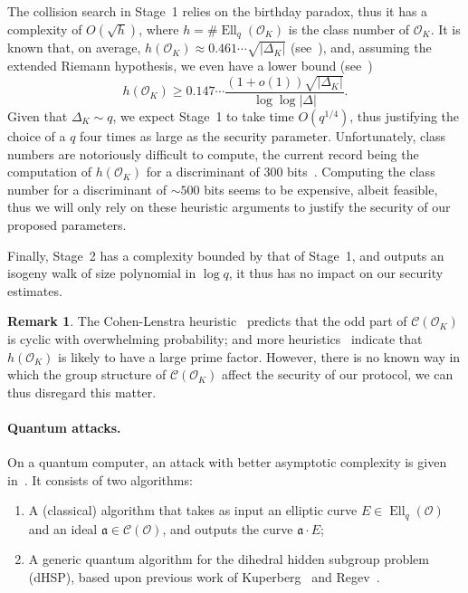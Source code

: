 \documentclass{article}
\newcommand{\Cl}{\mathcal{C}}
\renewcommand{\O}{\mathcal{O}}
\renewcommand{\frak}{\mathfrak}
\theoremstyle{definition}
\newtheorem{remark}[theorem]{Remark}
\DeclareMathOperator{\Ell}{Ell}
\begin{document}
The collision search in Stage~1 relies on the birthday paradox, thus
it has a complexity of $O(\sqrt{h})$, where $h=\#\Ell_q(\O_K)$ is the
class number of $\O_K$.  It is known that, on average,
$h(\O_K)≈0.461\cdots\sqrt{|Δ_K|}$ (see~\cite[5.10]{Cohen1993}), and,
assuming the extended Riemann hypothesis, we even have a lower bound
(see~\cite{littlewood1928class})
\[h(\O_K) ≥ 0.147\cdots\frac{(1+o(1))\sqrt{|Δ_K|}}{\log\log|Δ|}.\]
Given that $Δ_K\sim q$, we expect Stage~1 to take time $O(q^{1/4})$,
thus justifying the choice of a $q$ four times as large as the
security parameter.  Unfortunately, class numbers are notoriously
difficult to compute, the current record being the computation of
$h(\O_K)$ for a discriminant of 300
bits~\cite{10.1007/978-3-642-14081-5_15}. Computing the class
number for a discriminant of $\sim 500$ bits seems to be expensive,
albeit feasible, thus we will only rely on these heuristic arguments
to justify the security of our proposed parameters.

Finally, Stage~2 has a complexity bounded by that of Stage~1, and
outputs an isogeny walk of size polynomial in $\log q$, it thus has no
impact on our security estimates.

\begin{remark}
  The Cohen-Lenstra heuristic~\cite{10.1007/BFb0099440} predicts that
  the odd part of $\Cl(\O_K)$ is cyclic with overwhelming
  probability; and more heuristics~\cite{10.1007/3-540-44448-3_18}
  indicate that $h(\O_K)$ is likely to have a large prime factor.
  However, there is no known way in which the group structure of
  $\Cl(\O_K)$ affect the security of our protocol, we can thus
  disregard this matter.
\end{remark}

\paragraph{Quantum attacks.}
On a quantum computer, an attack with better asymptotic complexity is
given in~\cite{childs2014constructing}. It consists of two algorithms:
\begin{enumerate}
\item A (classical) algorithm that takes as input an elliptic curve
  $E∈\Ell_q(\O)$ and an ideal $\frak a∈\Cl(\O)$, and outputs the curve
  $\frak a·E$;
\item A generic quantum algorithm for the dihedral hidden subgroup
  problem (dHSP), based upon previous work of Kuperberg~\cite{Kup} and
  Regev~\cite{regev04}.
\end{enumerate}
\end{document}
